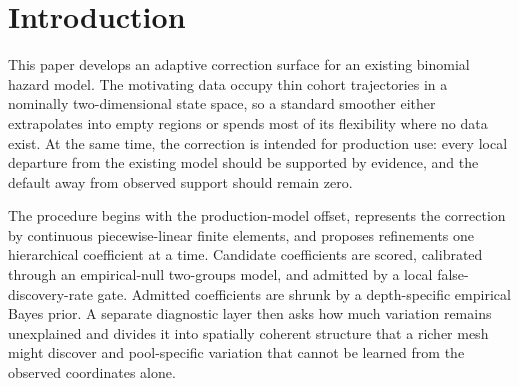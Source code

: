 \documentclass[11pt]{article}
\begin{document}
\begin{abstract}
pools and refitting ten matched real-data splits, held-out deviance increased from $6.4968$ to
$6.8108$ per pool. The same audit retracts the earlier interpretation of the April response as
SMM or exact cumulative terminations. It is a constructed loan-count attrition proxy because
the original count is reconstructed from original aggregate balance and the average original
loan size of the currently disclosed pool composition. Exact Gamma-frailty and
Poisson--lognormal formulas are used where available. A separate frozen-topology experiment replaces
split-genealogy borrowing by overlapping geometric covers and their intersections. The
resulting nested geometric correction improves locally balanced held-out likelihood
consistently, but its interaction precision is not yet estimated from a fully joint
conditional-information empirical-Bayes calculation; this layer is therefore reported as
experimental and is not included in the shipped code release. Current-estimator reruns also
clarify several claims inherited from older implementations: five-seed overdispersion and
omitted-known-shift audits reproduce the earlier attribution results, the old smooth
$q$-sweep U-curve is replaced by a fit--stability tradeoff, and the analytic leverage
correction reduces but does not eliminate downward variance bias at high frailty. We give a
cross-fitted pool-marginal likelihood as the principled next variance estimator rather than
introducing an empirical calibration constant.
\end{abstract}

\tableofcontents

\section{Introduction}\label{sec:intro}

This paper develops an adaptive correction surface for an existing binomial hazard model. The
motivating data occupy thin cohort trajectories in a nominally two-dimensional state space, so a
standard smoother either extrapolates into empty regions or spends most of its flexibility where no
data exist. At the same time, the correction is intended for production use: every local departure
from the existing model should be supported by evidence, and the default away from observed support
should remain zero.

The procedure begins with the production-model offset, represents the correction by continuous
piecewise-linear finite elements, and proposes refinements one hierarchical coefficient at a time.
Candidate coefficients are scored, calibrated through an empirical-null two-groups model, and admitted
by a local false-discovery-rate gate. Admitted coefficients are shrunk by a depth-specific empirical
Bayes prior. A separate diagnostic layer then asks how much variation remains unexplained and divides
it into spatially coherent structure that a richer mesh might discover and pool-specific variation
that cannot be learned from the observed coordinates alone.
\end{document}
